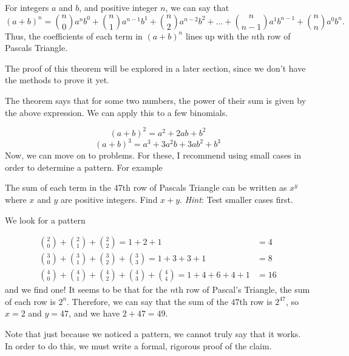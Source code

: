 \documentclass[11pt]{article}
\begin{document}
\begin{thrm}
	For integers $a$ and $b$, and positive integer $n$, we can say that
	\[(a+b)^n = \binom{n}{0}a^nb^0 + \binom{n}{1}a^{n-1}b^1 + \binom{n}{2}a^{n-2}b^2 + \dots + \binom{n}{n-1}a^1b^{n-1} + \binom{n}{n}a^0b^n.\]
	Thus, the coefficients of each term in $(a+b)^n$ lines up with the $n$th row of Pascals Triangle.
\end{thrm}
The proof of this theorem will be explored in a later section, since we don't have the methods to prove it yet.

The theorem says that for some two numbers, the power of their sum is given by the above expression. We can apply this to a few binomials.

\[(a+b)^2 = a^2 + 2ab + b^2\]
\[(a+b)^3 = a^3 + 3a^2b + 3ab^2 + b^3\]
Now, we can move on to problems. For these, I recommend using small cases in order to determine a pattern. For example

\begin{example}
	The sum of each term in the 47th row of Pascals Triangle can be written as $x^y$ where $x$ and $y$ are positive integers. Find $x + y$. \textit{Hint}: Test smaller cases first.
\end{example}
\begin{solution}
    We look for a pattern
    
    \begin{align*}
    	\binom{2}{0} + \binom{2}{1} + \binom{2}{2} = 1 + 2 + 1 &= 4 \\
    	\binom{3}{0} + \binom{3}{1} + \binom{3}{2} + \binom{3}{3} = 1 + 3 + 3 + 1 &= 8 \\
    	\binom{4}{0} + \binom{4}{1} + \binom{4}{2} + \binom{4}{3} + \binom{4}{4}= 1 + 4 + 6 + 4 + 1 &= 16
    \end{align*}
    and we find one! It seems to be that for the $n$th row of Pascal's Triangle, the sum of each row is $2^n$. Therefore, we can say that the sum of the $47$th row is $2^{47}$, so $x = 2$ and $y = 47$, and we have $2 + 47 = \boxed{49.}$
\end{solution}

\begin{remark} Note that just because we noticed a pattern, we cannot truly say that it works. In order to do this, we must write a formal, rigorous proof of the claim.
\end{remark}
\end{document}
